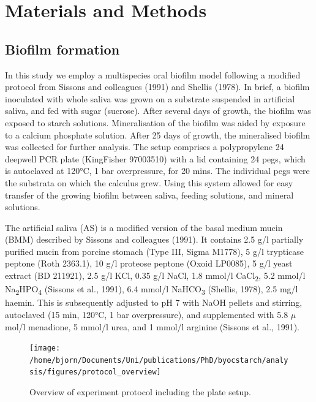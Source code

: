 \documentclass[
]{article}
\begin{document}
\hypertarget{materials-and-methods}{%
\section{Materials and Methods}\label{materials-and-methods}}

\hypertarget{biofilm-formation}{%
\subsection{Biofilm formation}\label{biofilm-formation}}

In this study we employ a multispecies oral biofilm model following a modified
protocol from Sissons and colleagues (1991) and
Shellis (1978). In brief, a biofilm inoculated
with whole saliva was grown on a substrate suspended in artificial saliva, and
fed with sugar (sucrose). After several days of growth, the biofilm was exposed
to starch solutions. Mineralisation of the biofilm was aided by exposure to a
calcium phosphate solution. After 25 days of growth, the mineralised biofilm was
collected for further analysis. The setup comprises a polypropylene
24 deepwell PCR plate (KingFisher 97003510) with a lid containing 24 pegs, which
is autoclaved at 120°C, 1 bar overpressure, for 20 mins. The individual pegs
were the substrata on which the calculus grew. Using this system allowed for easy
transfer of the growing biofilm between saliva, feeding solutions,
and mineral solutions.

The artificial saliva (AS) is a modified version of the basal medium mucin (BMM)
described by Sissons and colleagues (1991).
It contains 2.5 g/l partially purified mucin from porcine stomach (Type III, Sigma M1778),
5 g/l trypticase peptone (Roth 2363.1), 10 g/l proteose peptone (Oxoid LP0085),
5 g/l yeast extract (BD 211921), 2.5 g/l KCl, 0.35 g/l NaCl, 1.8 mmol/l CaCl\textsubscript{2},
5.2 mmol/l Na\textsubscript{2}HPO\textsubscript{4} (Sissons et al., 1991), 6.4 mmol/l NaHCO\textsubscript{3}
(Shellis, 1978), 2.5 mg/l haemin. This is subsequently
adjusted to pH 7 with NaOH pellets and stirring, autoclaved (15 min, 120°C,
1 bar overpressure), and supplemented with 5.8 \(\mu\)mol/l menadione, 5 mmol/l urea,
and 1 mmol/l arginine (Sissons et al., 1991).

\begin{figure}

{\centering \texttt{[image: /home/bjorn/Documents/Uni/publications/PhD/byocstarch/analysis/figures/protocol\_overview]} 

}

\caption{Overview of experiment protocol including the plate setup.}\label{fig:protocol-fig}
\end{figure}
\end{document}
